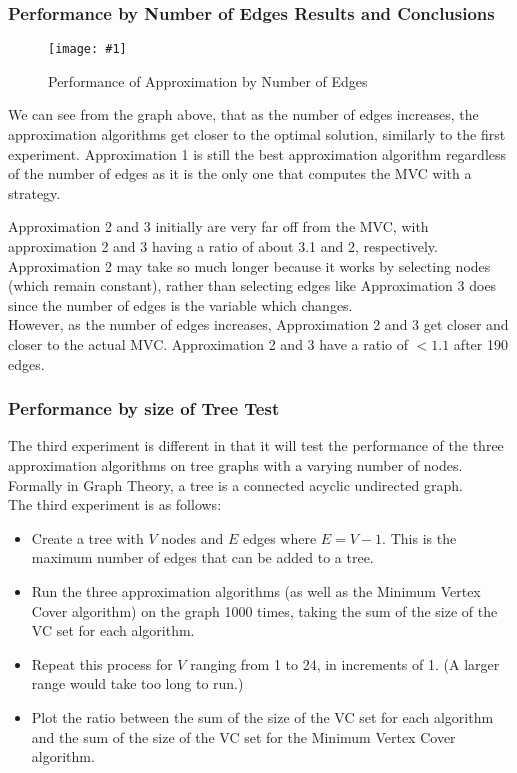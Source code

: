 \documentclass[12pt]{article}
\newcommand{\firgureBuffered}[2]
{
    \begin{figure}[ht!]
        \centering
        \texttt{[image: \#1]}
        \caption{#2}
    \end{figure}
}
\begin{document}
\subsubsection{Performance by Number of Edges Results and Conclusions}

\FloatBarrier{}
\firgureBuffered{images/approxexperiments/Edges.png}{Performance of Approximation by Number of Edges}
\FloatBarrier{}

We can see from the graph above, that as the number of edges increases, the approximation algorithms get closer to the optimal solution, similarly to the first experiment. Approximation 1 is still the best approximation algorithm regardless of the number of edges as it is the only one that computes the MVC with a strategy.

Approximation 2 and 3 initially are very far off from the MVC, with approximation 2 and 3 having a ratio of about 3.1 and 2, respectively. Approximation 2 may take so much longer because it works by selecting nodes (which remain constant), rather than selecting edges like Approximation 3 does since the number of edges is the variable which changes. \\

However, as the number of edges increases, Approximation 2 and 3 get closer and closer to the actual MVC. Approximation 2 and 3 have a ratio of $<1.1$ after 190 edges. \\

\subsubsection{Performance by size of Tree Test}

The third experiment is different in that it will test the performance of the three approximation algorithms on tree graphs with a varying number of nodes. Formally in Graph Theory, a tree is a connected acyclic undirected graph. \\

The third experiment is as follows:

\begin{itemize}
    \item Create a tree with $V$ nodes and $E$ edges where $E = V-1$. This is the maximum number of edges that can be added to a tree.
    \item Run the three approximation algorithms (as well as the Minimum Vertex Cover algorithm) on the graph 1000 times, taking the sum of the size of the VC set for each algorithm.
    \item Repeat this process for $V$ ranging from 1 to 24, in increments of 1. (A larger range would take too long to run.)
    \item Plot the ratio between the sum of the size of the VC set for each algorithm and the sum of the size of the VC set for the Minimum Vertex Cover algorithm.
\end{itemize}
\newpage
\end{document}
